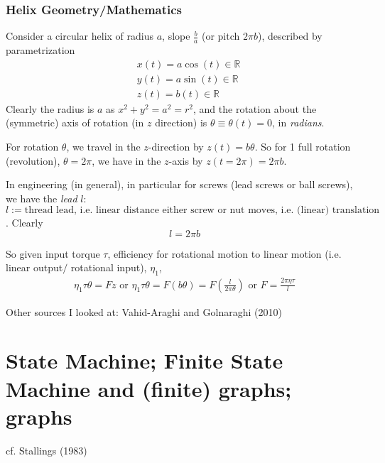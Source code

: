 \documentclass[10pt]{amsart}
\begin{document}
\begin{multicols*}{2}
\subsubsection{Helix Geometry/Mathematics}

Consider a circular helix of radius $a$, slope $\frac{b}{a}$ (or pitch $2\pi b$), described by parametrization 
\[
\begin{aligned}
	& x(t) = a \cos{(t)} \in \mathbb{R} \\ 
		& y(t) = a \sin{(t)} \in \mathbb{R} \\ 
	& z(t) = b(t) \in \mathbb{R}
\end{aligned}
\]
Clearly the radius is $a$ as $x^2 + y^2 = a^2 = r^2$, and the rotation about the (symmetric) axis of rotation (in $z$ direction) is $\theta \equiv \theta(t) = 0$, in \emph{radians}.  

For rotation $\theta$, we travel in the $z$-direction by $z(t) =b\theta$.  So for 1 full rotation (revolution), $\theta = 2\pi$, we have in the $z$-axis by $z(t=2\pi) =2\pi b$.  

In engineering (in general), in particular for screws (lead screws or ball screws), we have the \emph{lead} $l$: \\
$l:= \text{thread lead, i.e. linear distance either screw or nut moves, i.e. (linear) translation length (for 1 full rotation (revolution)) }$.  Clearly
\begin{equation}
l = 2\pi b
\end{equation}

So given input torque $\tau$, efficiency for rotational motion to linear motion (i.e. linear output$/$ rotational input), $\eta_1$, 
\begin{equation}
\begin{gathered}
\eta_1 \tau \theta = Fz \text{ or } \eta_1\tau \theta = F(b\theta) = F \left( \frac{l}{2\pi \theta } \right) \text{ or } \boxed{ F = \frac{2\pi \eta \tau }{l } }
\end{gathered}
\end{equation}

Other sources I looked at: 
Vahid-Araghi and Golnaraghi (2010) \cite{VaGo2010} 



\section{State Machine; Finite State Machine and (finite) graphs; graphs}

cf. Stallings (1983) \cite{Stal1983}


\end{multicols*}
\end{document}
